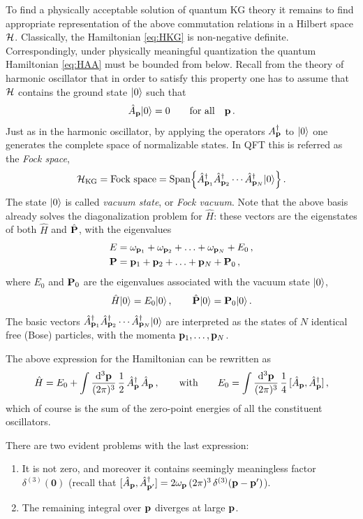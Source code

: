 To find a physically acceptable solution of quantum KG theory it remains to
find appropriate representation of the above commutation relations in a
Hilbert space $\mathcal{H}$. Classically, the Hamiltonian \eqref{eq:HKG} is
non-negative definite. Correspondingly, under physically meaningful
quantization the quantum Hamiltonian \eqref{eq:HAA} must be bounded from
below. Recall from the theory of harmonic oscillator that in order to satisfy
this property one has to assume that $\mathcal{H}$ contains the ground state
$|0\rangle$ such that
\[
\hat A_{\mathbf{p}}|0\rangle=0\qquad\text{for all}\quad\mathbf{p}\,.
\]
Just as in the harmonic oscillator, by applying the operators
$A^\dagger_{\mathbf{p}}$ to $|0\rangle$ one generates the complete space of normalizable
states. In QFT this is referred as the \emph{Fock space},
\[
\mathcal{H}_{\mathrm{KG}}=\text{Fock space}=\operatorname{Span}\Bigl\{\hat A^\dagger_{\mathbf{p}_1}\hat A^\dagger_{\mathbf{p}_2}\cdots\hat A^\dagger_{\mathbf{p}_N}|0\rangle\Bigr\}\,.
\]
The state $|0\rangle$ is called \emph{vacuum state}, or \emph{Fock vacuum}. Note
that the above basis already solves the diagonalization problem for $\hat H$:
these vectors are the eigenstates of both $\hat H$ and $\hat{\mathbf{P}}$, with the
eigenvalues
\begin{align*}
E&=\omega_{\mathbf{p}_1}+\omega_{\mathbf{p}_2}+\ldots+\omega_{\mathbf{p}_N}+E_0\,,\\
\mathbf{P}&=\mathbf{p}_1+\mathbf{p}_2+\ldots+\mathbf{p}_N+\mathbf{P}_0\,,
\end{align*}
where $E_0$ and $\mathbf{P}_0$ are the eigenvalues associated with the vacuum state
$|0\rangle$,
\[
\hat H|0\rangle=E_0|0\rangle\,,\qquad \hat{\mathbf{P}}|0\rangle=\mathbf{P}_0|0\rangle\,.
\]
The basic vectors $\hat A^\dagger_{\mathbf{p}_1}\hat A^\dagger_{\mathbf{p}_2}\cdots\hat A^\dagger_{\mathbf{p}_N}|0\rangle$
are interpreted as the states of $N$ identical free (Bose) particles, with
the momenta $\mathbf{p}_1,\dots,\mathbf{p}_N$.

The above expression for the Hamiltonian can be rewritten as
\[
\hat H=E_0+\int\frac{\mathop{}\!\mathrm{d}^3\mathbf{p}}{(2\pi)^3}\,\frac12\,\hat A^\dagger_{\mathbf{p}}\,\hat A_{\mathbf{p}}\,,
\qquad\text{with}\qquad
E_0=\int\frac{\mathop{}\!\mathrm{d}^3\mathbf{p}}{(2\pi)^3}\,\frac14\,[\hat A_{\mathbf{p}},\hat A^\dagger_{\mathbf{p}}]\,,
\]
which of course is the sum of the zero-point energies of all the constituent
oscillators.

There are two evident problems with the last expression:
\begin{enumerate}[label=(\roman*)]
\item It is not zero, and moreover it contains seemingly meaningless factor
$\delta^{(3)}(\mathbf{0})$ (recall that
$[\hat A_{\mathbf{p}},\hat A^\dagger_{\mathbf{p}'}]=2\omega_{\mathbf{p}}\,(2\pi)^3\,\delta^{(3)}(\mathbf{p}-\mathbf{p}')$).
\item The remaining integral over $\mathbf{p}$ diverges at large $\mathbf{p}$.
\end{enumerate}

